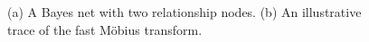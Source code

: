 \documentclass{article}
\begin{document}
\begin{figure}[tb]
\begin{center}
\caption{(a) A Bayes net with two relationship nodes. (b) An illustrative trace of the fast M\"obius transform. 
\label{fig:example}}
\end{center}
\end{figure}
\end{document}
